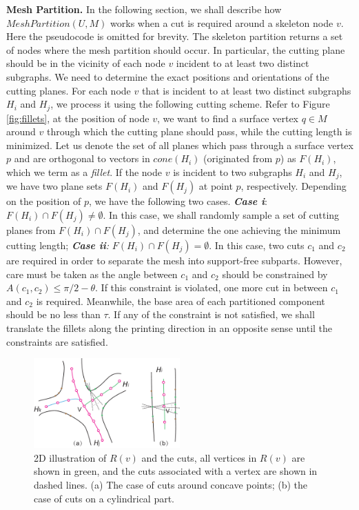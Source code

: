 \textbf{Mesh Partition.}
{{In the following section, we shall describe how $MeshPartition(U , M)$ works when a cut is required around a skeleton node $v$. Here the pseudocode is omitted for brevity.}}
The skeleton partition returns a set of nodes where the mesh partition should occur. In particular, the cutting plane should be in the vicinity of each node $v$ incident to at least two distinct subgraphs. We need to determine the exact positions and orientations of the cutting planes. For each node $v$ that is incident to at least two distinct subgraphs $H_i$ and $H_j$, we process it using the following cutting scheme.
Refer to Figure \ref{fig:fillets}, at the position of node $v$, we want to find a surface vertex $q \in M$ around $v$ through which the cutting plane should pass, while the cutting length is minimized. Let us denote the set of all planes which pass through a surface vertex $p$ and are orthogonal to vectors in $cone(H_i)$ (originated from $p$)  as $F(H_i)$, which we term as a \emph{fillet}. If the node $v$ is incident to two subgraphs $H_i$ and $H_j$, we have two plane sets $F(H_i)$ and $F(H_j)$ at point $p$, respectively. Depending on the position of $p$, we have the following two cases. \emph{\textbf{Case i}}: $F(H_i) \cap F(H_j) \neq \emptyset$. In this case, we shall randomly sample a set of cutting planes from $F(H_i) \cap F(H_j)$, and determine the one achieving the minimum cutting length; \emph{\textbf{Case ii}:} $F(H_i) \cap F(H_j) = \emptyset$. In this case, two cuts $c_1$ and $c_2$ are required in order to separate the mesh into support-free subparts. However, care must be taken as the angle between $c_1$ and $c_2$ should be constrained by $A(c_1, c_2) \leq \pi/2-\theta$. If this constraint is violated, one more cut in between $c_1$ and $c_2$ is required. Meanwhile, the base area of each partitioned component should be no less than $\tau$. If any of the constraint is not satisfied, we shall translate the fillets along the printing direction in an opposite sense until the constraints are satisfied.

\begin{figure}[tbp]
  \centering
  \includegraphics[width=0.5\textwidth]{figs/forward_tracing.pdf}
  \caption{\label{fig:forward_tracing}%
           2D illustration of $R(v)$ and the cuts, all vertices in $R(v)$ are shown in green, and the cuts associated with a vertex are shown in dashed lines. (a) The case of cuts around concave points; (b) the case of cuts on a cylindrical part.}
\end{figure}

